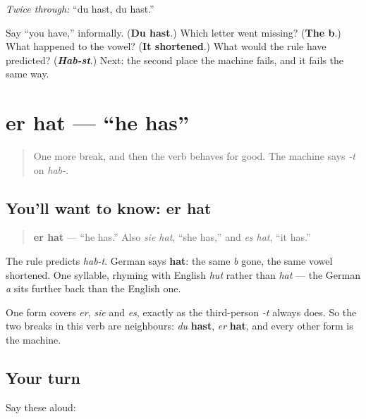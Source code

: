 \emph{Twice through:} \textquotedblleft{}du hast, du hast.\textquotedblright{}

\begin{tcolorbox}[breakable,colback=teal!4,colframe=teal!35!black,title={Before you move on}]
Say \textquotedblleft{}you have,\textquotedblright{} informally. (\textbf{Du hast}.) Which letter went missing? (\textbf{The b}.) What happened to the vowel? (\textbf{It shortened}.) What would the rule have predicted? (\emph{\textbf{Hab-st}}.) Next: the second place the machine fails, and it fails the same way.
\end{tcolorbox}
\section[er hat]{er hat — \textquotedblleft{}he has\textquotedblright{}}

\label{lesson:GE-C14-er-hat}



\begin{quote}
One more break, and then the verb behaves for good. The machine says \emph{-t} on \emph{hab-}.
\end{quote}

\subsection*{You'll want to know: er hat}
\begin{quote}
\textbf{er hat} — \textquotedblleft{}he has.\textquotedblright{} Also \emph{sie hat}, \textquotedblleft{}she has,\textquotedblright{} and \emph{es hat}, \textquotedblleft{}it has.\textquotedblright{}
\end{quote}

The rule predicts \emph{hab-t}. German says \textbf{hat}: the same \emph{b} gone, the same vowel shortened. One syllable, rhyming with English \emph{hut} rather than \emph{hat} — the German \emph{a} sits further back than the English one.

One form covers \emph{er}, \emph{sie} and \emph{es}, exactly as the third-person \emph{-t} always does. So the two breaks in this verb are neighbours: \emph{du} \textbf{hast}, \emph{er} \textbf{hat}, and every other form is the machine.

\subsection*{Your turn}
Say these aloud:

